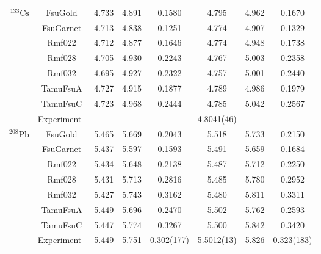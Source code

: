 \begin{longtable}{@{\extracolsep{\fill}}r || c | *{3}{c} | *{3}{c}}
\hline
$^{133}\mathrm{Cs}$ & FsuGold & 4.733 & 4.891 & 0.1580 & 4.795 & 4.962 & 0.1670 \\
 & FsuGarnet & 4.713 & 4.838 & 0.1251 & 4.774 & 4.907 & 0.1329  \\
 & Rmf022 & 4.712 & 4.877 & 0.1646 & 4.774 & 4.948 & 0.1738 \\
 & Rmf028 & 4.705 & 4.930 & 0.2243 & 4.767 & 5.003 & 0.2358 \\
 & Rmf032 & 4.695 & 4.927 & 0.2322 & 4.757 & 5.001 & 0.2440 \\
 & TamuFsuA & 4.727 & 4.915 & 0.1877 & 4.789 & 4.986 & 0.1979 \\
 & TamuFsuC & 4.723 & 4.968 & 0.2444 & 4.785 & 5.042 & 0.2567 \\ 
\hline
& Experiment~\cite{angeli:2013:table} &  &  &  & 4.8041(46) &  & \\ 
\hline
$^{208}\mathrm{Pb}$ & FsuGold & 5.465 & 5.669 & 0.2043 & 5.518 & 5.733 & 0.2150 \\
 & FsuGarnet & 5.437 & 5.597 & 0.1593 & 5.491 & 5.659 & 0.1684 \\
 & Rmf022 & 5.434 & 5.648 & 0.2138 & 5.487 & 5.712 & 0.2250 \\
 & Rmf028 & 5.431 & 5.713 & 0.2816 & 5.485 & 5.780 & 0.2952 \\
 & Rmf032 & 5.427 & 5.743 & 0.3162 & 5.480 & 5.811 & 0.3311 \\
 & TamuFsuA & 5.449 & 5.696 & 0.2470 & 5.502 & 5.762 & 0.2593 \\
 & TamuFsuC & 5.447 & 5.774 & 0.3267 & 5.500 & 5.842 & 0.3420 \\ 
\hline
& Experiment~\cite{angeli:2013:table, horowitz:2012:weak} & 5.449 & 5.751 & 0.302(177) & 5.5012(13) & 5.826 & 0.323(183) 
\\ 
\end{longtable}





